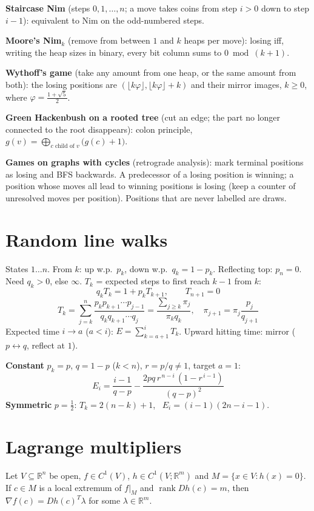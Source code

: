\textbf{Staircase Nim} (steps $0, 1, \dots, n$; a move takes coins from
step $i > 0$ down to step $i-1$): equivalent to Nim on the odd-numbered steps.

\textbf{Moore's Nim$_k$} (remove from between $1$ and $k$ heaps per move): losing iff,
writing the heap sizes in binary, every bit column sums to $0 \bmod (k+1)$.

\textbf{Wythoff's game} (take any amount from one heap, or the same amount from both):
the losing positions are $(\lfloor k\varphi \rfloor, \lfloor k\varphi \rfloor + k)$
and their mirror images, $k \ge 0$, where $\varphi = \frac{1+\sqrt5}{2}$.

\textbf{Green Hackenbush on a rooted tree} (cut an edge; the part no longer connected
to the root disappears): colon principle,
$g(v) = \bigoplus_{c \text{ child of } v} \big(g(c) + 1\big)$.

\textbf{Games on graphs with cycles} (retrograde analysis): mark terminal positions as
losing and BFS backwards. A predecessor of a losing position is winning; a position
whose moves all lead to winning positions is losing (keep a counter of unresolved
moves per position). Positions that are never labelled are draws.

\section{Random line walks}
States $1\dots n$. From $k$: up w.p.\ $p_k$, down w.p.\ $q_k = 1-p_k$.
Reflecting top: $p_n=0$. Need $q_k>0$, else $\infty$.
$T_k$ = expected steps to first reach $k-1$ from $k$:
\[ q_k T_k = 1 + p_k T_{k+1}, \qquad T_{n+1}=0 \]
\[ T_k = \sum_{j=k}^{n} \frac{p_k p_{k+1}\cdots p_{j-1}}{q_k q_{k+1}\cdots q_j}
       = \frac{\sum_{j\ge k}\pi_j}{\pi_k q_k}, \quad \pi_{j+1}=\pi_j\frac{p_j}{q_{j+1}} \]
Expected time $i\to a$ ($a<i$): $E = \sum_{k=a+1}^{i} T_k$.
Upward hitting time: mirror ($p\leftrightarrow q$, reflect at $1$).
 
\textbf{Constant} $p_k=p$, $q=1-p$ ($k<n$), $r=p/q\neq 1$, target $a=1$:
\[ E_i = \frac{i-1}{q-p} - \frac{2pq\, r^{\,n-i}\,(1-r^{\,i-1})}{(q-p)^2} \]
\textbf{Symmetric} $p=\frac12$: $T_k=2(n-k)+1$, \ $E_i=(i-1)(2n-i-1)$.


\section{Lagrange multipliers}
Let $V \subseteq \mathbb R^n$ be open, $f \in C^1(V)$, $h \in C^1(V; \mathbb R^m)$ and
$M = \{x \in V : h(x) = 0\}$. If $c \in M$ is a local extremum of $f|_M$ and
$\operatorname{rank} Dh(c) = m$, then $\nabla f(c) = Dh(c)^T \lambda$ for some $\lambda \in \mathbb R^m$.